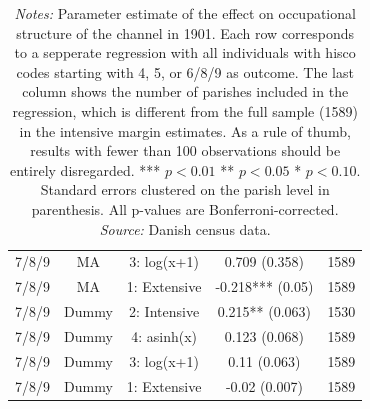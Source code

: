 \begin{table}[]
\begin{tabular}{ccccc}
7/8/9 & MA & 3: log(x+1) & 0.709 (0.358) & 1589\\
7/8/9 & MA & 1: Extensive & -0.218*** (0.05) & 1589\\
7/8/9 & Dummy & 2: Intensive & 0.215** (0.063) & 1530\\
7/8/9 & Dummy & 4: asinh(x) & 0.123 (0.068) & 1589\\
7/8/9 & Dummy & 3: log(x+1) & 0.11 (0.063) & 1589\\
7/8/9 & Dummy & 1: Extensive & -0.02 (0.007) & 1589\\
\bottomrule
\end{tabular}
\parbox{0.9\textwidth}{
\caption*{\footnotesize \textit{Notes:} Parameter estimate of the effect on occupational structure of the channel in 1901. Each row corresponds to a sepperate regression with all individuals with hisco codes starting with 4, 5, or 6/8/9 as outcome. The last column shows the number of parishes included in the regression, which is different from the full sample (1589) in the intensive margin estimates. As a rule of thumb, results with fewer than 100 observations should be entirely disregarded. *** $p< 0.01$ ** $p< 0.05$ * $p< 0.10$. Standard errors clustered on the parish level in parenthesis. All p-values are Bonferroni-corrected. \\ \textit{Source:} Danish census data.}
}
\end{table}

\FloatBarrier


